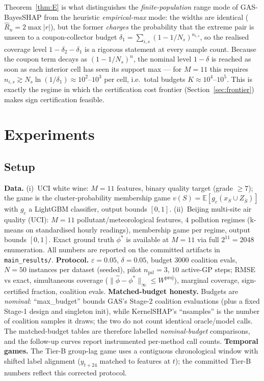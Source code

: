 \documentclass[11pt,twocolumn]{article}
\newcommand{\E}{\mathbb{E}}
\begin{document}
Theorem~\ref{thm:E} is what distinguishes the \emph{finite-population} range
mode of GAS-BayesSHAP from the heuristic \emph{empirical-max} mode: the
widths are identical ($\hat R_n=2\max|r|$), but the former \emph{charges}
the probability that the extreme pair is unseen to a coupon-collector
budget $\delta_1=\sum_{i,s}(1-1/N_s)^{n_{i,s}}$, so the realised coverage
level $1-\delta_2-\delta_1$ is a rigorous statement at every sample count.
Because the coupon term decays as $(1-1/N_s)^n$, the nominal level $1-\delta$
is reached as soon as each interior cell has seen its support max — for
$M=11$ this requires $n_{i,s}\gtrsim N_s\ln(1/\delta_1)\approx
10^2$--$10^3$ per cell, i.e.\ total budgets $K\approx10^4$--$10^5$.  This
is exactly the regime in which the certification cost frontier
(Section~\ref{sec:frontier}) makes sign certification feasible.

\section{Experiments}\label{sec:exp}
\subsection{Setup}\label{sec:setup}
\textbf{Data.}  (i)~UCI white wine: $M=11$ features, binary quality target
(grade $\ge7$); the game is the cluster-probability membership game
$v(S)=\E[g_c(x_S\cup Z_{\bar S})]$ with $g_c$ a LightGBM classifier, output
bounds $[0,1]$.  (ii)~Beijing multi-site air quality (UCI): $M=11$
pollutant/meteorological features, $4$ pollution regimes (k-means on
standardised hourly readings), membership game per regime, output bounds
$[0,1]$.  Exact ground truth $\phi^*$ is available at $M=11$ via full
$2^{11}=2048$ enumeration.  All numbers are reported on the committed
artifacts in \texttt{main\_results/}.
\textbf{Protocol.}  $\varepsilon=0.05$, $\delta=0.05$, budget $3000$
coalition evals, $N=50$ instances per dataset (seeded), pilot $n_{\mathrm
pil}=3$, $10$ active-GP steps; RMSE vs exact, simultaneous coverage
($\|\hat\phi-\phi^*\|_\infty\le W^{\mathrm{proj}}$), marginal coverage,
sign-certified fraction, coalition evals.
\textbf{Matched-budget honesty.}  Budgets are \emph{nominal}:
``max\_budget'' bounds GAS's Stage-2 coalition evaluations (plus a fixed
Stage-1 design and singleton init), while KernelSHAP's ``nsamples'' is the
number of coalition samples it draws; the two do not count identical
oracle/model calls.  The matched-budget tables are therefore labelled
\emph{nominal-budget} comparisons, and the follow-up curves report
instrumented per-method call counts.
\textbf{Temporal games.}  The Tier-B group-lag game uses a contiguous
chronological window with shifted label alignment ($y_{t+24}$ matched to
features at $t$); the committed Tier-B numbers reflect this corrected
protocol.
\end{document}
